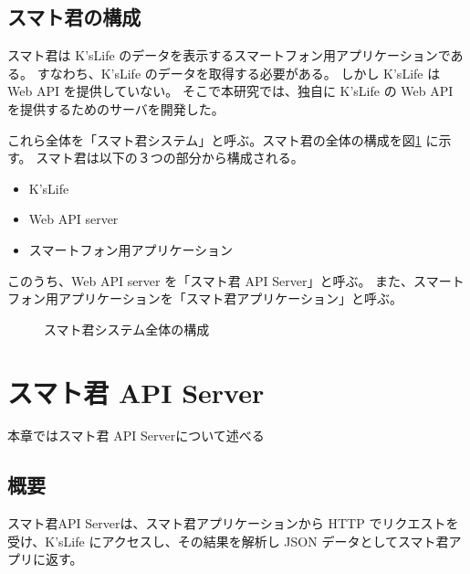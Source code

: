 \documentclass[a4j,12pt,onecolumn,oneside,titlepage,openany,final]{jreport}
\begin{document}
\section{スマト君の構成}\label{kizon_database}
スマト君は K'sLife のデータを表示するスマートフォン用アプリケーションである。
すなわち、K'sLife のデータを取得する必要がある。
しかし K'sLife は Web API を提供していない。
そこで本研究では、独自に K'sLife の Web API を提供するためのサーバを開発した。

これら全体を「スマト君システム」と呼ぶ。スマト君の全体の構成を図\ref{kousei} に示す。
スマト君は以下の３つの部分から構成される。
\begin{itemize}
\item K'sLife
\item Web API server
\item スマートフォン用アプリケーション
\end{itemize}

このうち、Web API server を「スマト君 API Server」と呼ぶ。
また、スマートフォン用アプリケーションを「スマト君アプリケーション」と呼ぶ。
\begin{figure}[htbp]
  \centering %
\caption{スマト君システム全体の構成}\label{kousei}
\end{figure}


\chapter{スマト君 API Server}\label{api}
本章ではスマト君 API Serverについて述べる

\section{概要}\label{rihabiri_jisso}
スマト君API Serverは、スマト君アプリケーションから HTTP でリクエストを受け、K'sLife にアクセスし、その結果を解析し JSON データとしてスマト君アプリに返す。
\end{document}
